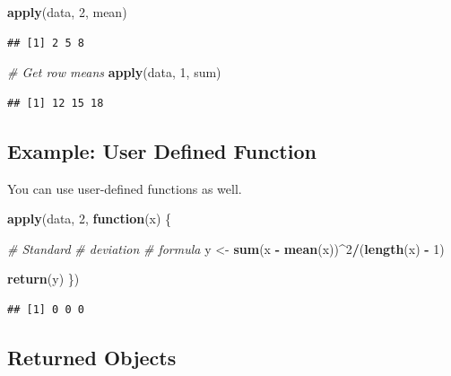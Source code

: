 \documentclass[
]{book}
\newenvironment{Shaded}{\begin{snugshade}}{\end{snugshade}}
\newcommand{\CommentTok}[1]{\textcolor[rgb]{0.56,0.35,0.01}{\textit{#1}}}
\newcommand{\ControlFlowTok}[1]{\textcolor[rgb]{0.13,0.29,0.53}{\textbf{#1}}}
\newcommand{\DecValTok}[1]{\textcolor[rgb]{0.00,0.00,0.81}{#1}}
\newcommand{\KeywordTok}[1]{\textcolor[rgb]{0.13,0.29,0.53}{\textbf{#1}}}
\newcommand{\NormalTok}[1]{#1}
\newcommand{\OperatorTok}[1]{\textcolor[rgb]{0.81,0.36,0.00}{\textbf{#1}}}
\newcommand{\StringTok}[1]{\textcolor[rgb]{0.31,0.60,0.02}{#1}}
\begin{document}
\begin{Shaded}
\begin{Highlighting}[]
\KeywordTok{apply}\NormalTok{(data, }\DecValTok{2}\NormalTok{, mean)}
\end{Highlighting}
\end{Shaded}

\begin{verbatim}
## [1] 2 5 8
\end{verbatim}

\begin{Shaded}
\begin{Highlighting}[]
\CommentTok{# Get row means}
\KeywordTok{apply}\NormalTok{(data, }\DecValTok{1}\NormalTok{, sum)}
\end{Highlighting}
\end{Shaded}

\begin{verbatim}
## [1] 12 15 18
\end{verbatim}

\hypertarget{example-user-defined-function}{%
\subsection*{Example: User Defined Function}\label{example-user-defined-function}}

You can use user-defined functions as well.

\begin{Shaded}
\begin{Highlighting}[]
\KeywordTok{apply}\NormalTok{(data, }\DecValTok{2}\NormalTok{, }\ControlFlowTok{function}\NormalTok{(x) \{}

    \CommentTok{# Standard}
    \CommentTok{# deviation}
    \CommentTok{# formula}
\NormalTok{    y <-}\StringTok{ }\KeywordTok{sum}\NormalTok{(x }\OperatorTok{-}\StringTok{ }\KeywordTok{mean}\NormalTok{(x))}\OperatorTok{^}\DecValTok{2}\OperatorTok{/}\NormalTok{(}\KeywordTok{length}\NormalTok{(x) }\OperatorTok{-}
\StringTok{        }\DecValTok{1}\NormalTok{)}

    \KeywordTok{return}\NormalTok{(y)}
\NormalTok{\})}
\end{Highlighting}
\end{Shaded}

\begin{verbatim}
## [1] 0 0 0
\end{verbatim}

\hypertarget{returned-objects}{%
\subsection{Returned Objects}\label{returned-objects}}
\end{document}

